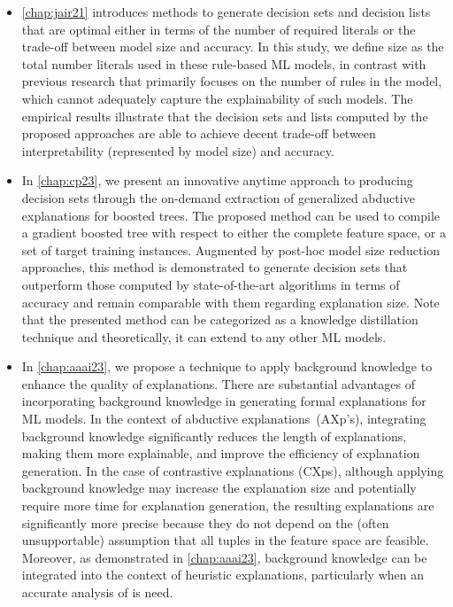 \begin{itemize}
	\item \autoref{chap:jair21} introduces methods to generate decision sets and decision lists 
		that are optimal either in terms of the number of required literals or 
		the trade-off between model size and accuracy.
		In this study, we define size as the total number literals used in these rule-based ML models,
		in contrast with previous research that primarily focuses on the number of rules in
		the model, which cannot adequately capture the explainability of such models.
		The empirical results illustrate that the decision sets and lists computed by the
		proposed approaches are able to achieve decent trade-off between interpretability (represented by model size) and accuracy.

	\item In \autoref{chap:cp23}, we present an innovative anytime approach to producing decision sets
		through the on-demand extraction of generalized abductive explanations for boosted
		trees.
		The proposed method can be used to compile a gradient boosted tree
		with respect to either the complete feature space, or a set of
		target training instances.
		Augmented by post-hoc model size reduction approaches, 
		this method is demonstrated to generate decision sets that outperform those
		computed by state-of-the-art algorithms in terms of accuracy and remain 
		comparable with them regarding explanation size.
		Note that the presented method can be categorized as a knowledge distillation technique and theoretically, 
		it can extend to any other ML models.

	\item In \autoref{chap:aaai23}, we propose a technique to apply background knowledge to enhance 
		the quality of explanations. 
		There are substantial advantages of incorporating background knowledge in generating
		formal explanations for ML models.
		In the context of abductive explanations~(AXp's), 
		integrating background knowledge significantly reduces the length of explanations, 
		making them more explainable, and improve the efficiency of explanation generation.
		In the case of contrastive explanations (CXps), although applying background knowledge may 
		increase the explanation size and potentially require more time for explanation generation, 
		the resulting explanations are significantly more precise because they do not 
		depend on the (often unsupportable) assumption that all tuples in the feature space 
		are feasible.
		Moreover, as demonstrated in \autoref{chap:aaai23}, background knowledge can be 
		integrated into the context of heuristic explanations, particularly when an accurate
		analysis of is need.


\end{itemize}
